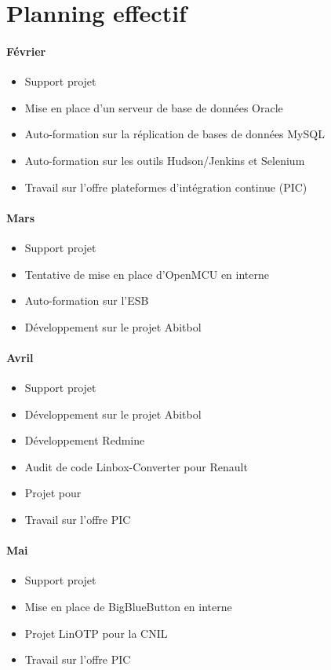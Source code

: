 \section{Planning effectif}

\paragraph{Février}
\begin{itemize}
	\item Support projet
	\item Mise en place d'un serveur de base de données Oracle
	\item Auto-formation sur la réplication de bases de données MySQL
	\item Auto-formation sur les outils Hudson/Jenkins et Selenium
	\item Travail sur l'offre \og plateformes d'intégration continue \fg{} (PIC)
\end{itemize}

\paragraph{Mars}
\begin{itemize}
	\item Support projet
	\item Tentative de mise en place d'OpenMCU en interne
	\item Auto-formation sur l'ESB \apetals{}
	\item Développement sur le projet Abitbol
\end{itemize}

\paragraph{Avril}
\begin{itemize}
	\item Support projet
	\item Développement sur le projet Abitbol
	\item Développement Redmine
	\item Audit de code Linbox-Converter pour Renault
	\item Projet \acentreon{} pour \adacast{}
	\item Travail sur l'offre PIC
\end{itemize}

\paragraph{Mai}
\begin{itemize}
	\item Support projet
	\item Mise en place de BigBlueButton en interne
	\item Projet LinOTP pour la CNIL
	\item Travail sur l'offre PIC
\end{itemize}

